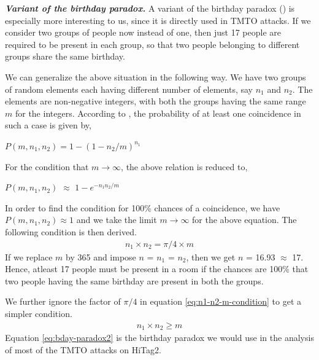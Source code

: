 \noindent \textit{\textbf{Variant of the birthday paradox.}} A variant of the birthday paradox (\cite{GeneralizedAttack}) is especially more interesting to us, since it is directly used in TMTO attacks. If we consider two groups of people now instead of one, then just 17 people are required to be present in each group, so that two people belonging to different groups share the same birthday.  

We can generalize the above situation in the following way. We have two groups of random elements each having different number of elements, say $n_1$ and $n_2$. The elements are non-negative integers, with both the groups having the same range $m$ for the integers. According to \cite{menezes}, the probability of at least one coincidence in such a case is given by,
\begin{center}
$P(m, n_1, n_2) = 1 -(1 - n_2/m)^{n_1}$
\end{center}
For the condition that $m \rightarrow \infty$, the above relation is reduced to,
\begin{center}
$P(m, n_1, n_2)$ $\approx$ $1 - e^{-{n_{1} n_{2}}/{m}}$
\end{center}
In order to find the condition for 100\% chances of a coincidence, we have $P(m, n_1, n_2) \approx 1$ and we take the limit $m \rightarrow \infty$ for the above equation. The following condition is then derived.
\begin{align}
\label{eq:n1-n2-m-condition} n_1 \times n_2 = \pi/4 \times m
\end{align}
If we replace $m$ by 365 and impose $n$ = $n_1$ = $n_2$, then we get $n$ = 16.93 $\approx$ 17. Hence, atleast 17 people must be present in a room if the chances are 100\% that two people having the same birthday are present in both the groups. 

We further ignore the factor of $\pi/4$ in equation \ref{eq:n1-n2-m-condition} to get a simpler condition.  
\begin{align}
\label{eq:bday-paradox2} n_1 \times n_2 \geq m
\end{align}
Equation \ref{eq:bday-paradox2} is the birthday paradox we would use in the analysis of most of the TMTO attacks on HiTag2.




